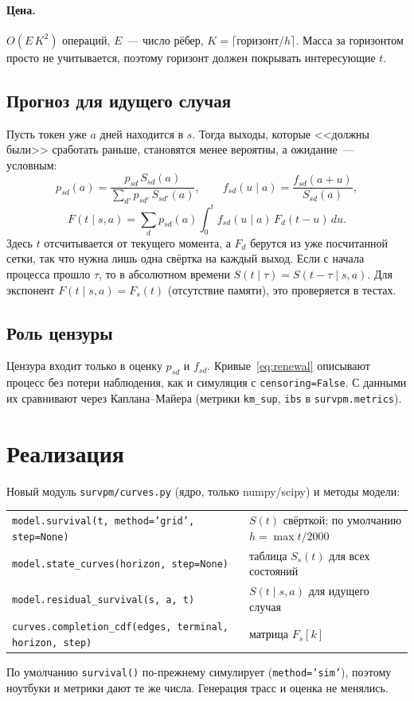 \documentclass[11pt,a4paper]{article}
\newcommand{\code}[1]{\texttt{#1}}
\begin{document}
\paragraph{Цена.} $O(E\,K^2)$ операций, $E$~--- число рёбер, $K=\lceil\text{горизонт}/h\rceil$.
Масса за горизонтом просто не учитывается, поэтому горизонт должен покрывать интересующие $t$.

\subsection{Прогноз для идущего случая}

Пусть токен уже $a$ дней находится в $s$. Тогда выходы, которые <<должны были>> сработать раньше,
становятся менее вероятны, а ожидание~--- условным:
\[
p_{sd}(a)=\frac{p_{sd}\,S_{sd}(a)}{\sum_{d'}p_{sd'}\,S_{sd'}(a)},\qquad
f_{sd}(u\mid a)=\frac{f_{sd}(a+u)}{S_{sd}(a)},
\]
\[
F(t\mid s,a)=\sum_d p_{sd}(a)\int_0^t f_{sd}(u\mid a)\,F_d(t-u)\,du .
\]
Здесь $t$ отсчитывается от текущего момента, а $F_d$ берутся из уже посчитанной сетки, так что
нужна лишь одна свёртка на каждый выход. Если с начала процесса прошло $\tau$, то
в абсолютном времени $S(t\mid\tau)=S(t-\tau\mid s,a)$. Для экспонент $F(t\mid s,a)=F_s(t)$
(отсутствие памяти), это проверяется в тестах.

\subsection{Роль цензуры}

Цензура входит только в оценку $p_{sd}$ и $f_{sd}$. Кривые~\eqref{eq:renewal} описывают процесс
без потери наблюдения, как и симуляция с \code{censoring=False}. С данными их сравнивают через
Каплана--Майера (метрики \code{km\_sup}, \code{ibs} в \code{survpm.metrics}).

\section{Реализация}

Новый модуль \code{survpm/curves.py} (ядро, только numpy/scipy) и методы модели:
\begin{center}\small
\begin{tabular}{@{}lp{5.2cm}@{}}
\toprule
\code{model.survival(t, method='grid', step=None)} & $S(t)$ свёрткой; по умолчанию $h=\max t/2000$\\
\code{model.state\_curves(horizon, step=None)} & таблица $S_s(t)$ для всех состояний\\
\code{model.residual\_survival(s, a, t)} & $S(t\mid s,a)$ для идущего случая\\
\code{curves.completion\_cdf(edges, terminal, horizon, step)} & матрица $F_s[k]$\\
\bottomrule
\end{tabular}
\end{center}
По умолчанию \code{survival()} по-прежнему симулирует (\code{method='sim'}), поэтому ноутбуки и
метрики дают те же числа. Генерация трасс и оценка не менялись.
\end{document}
